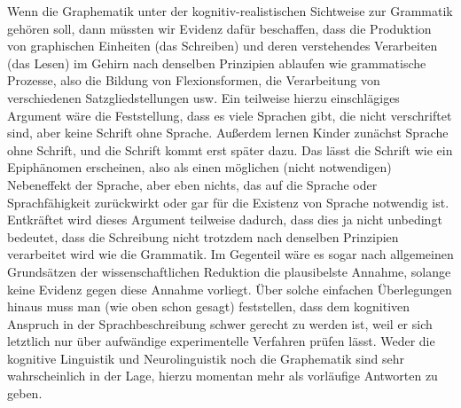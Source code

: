\newpage

Wenn die Graphematik unter der kognitiv-realistischen Sichtweise zur Grammatik gehören soll, dann müssten wir Evidenz dafür beschaffen, dass die Produktion von graphischen Einheiten (das Schreiben) und deren verstehendes Verarbeiten (das Lesen) im Gehirn nach denselben Prinzipien ablaufen wie grammatische Prozesse, also die Bildung von Flexionsformen, die Verarbeitung von verschiedenen Satzgliedstellungen usw.
Ein teilweise hierzu einschlägiges Argument wäre die Feststellung, dass es viele Sprachen gibt, die nicht verschriftet sind, aber keine Schrift ohne Sprache.
Außerdem lernen Kinder zunächst Sprache ohne Schrift, und die Schrift kommt erst später dazu.
Das lässt die Schrift wie ein Epiphänomen erscheinen, also als einen möglichen (nicht notwendigen) Nebeneffekt der Sprache, aber eben nichts, das auf die Sprache oder Sprachfähigkeit zurückwirkt oder gar für die Existenz von Sprache notwendig ist.
Entkräftet wird dieses Argument teilweise dadurch, dass dies ja nicht unbedingt bedeutet, dass die Schreibung nicht trotzdem nach denselben Prinzipien verarbeitet wird wie die Grammatik.
Im Gegenteil wäre es sogar nach allgemeinen Grundsätzen der wissenschaftlichen Reduktion die plausibelste Annahme, solange keine Evidenz gegen diese Annahme vorliegt.
Über solche einfachen Überlegungen hinaus muss man (wie oben schon gesagt) feststellen, dass dem kognitiven Anspruch in der Sprachbeschreibung schwer gerecht zu werden ist, weil er sich letztlich nur über aufwändige experimentelle Verfahren prüfen lässt.
Weder die kognitive Linguistik und Neurolinguistik noch die Graphematik sind sehr wahrscheinlich in der Lage, hierzu momentan mehr als vorläufige Antworten zu geben.

